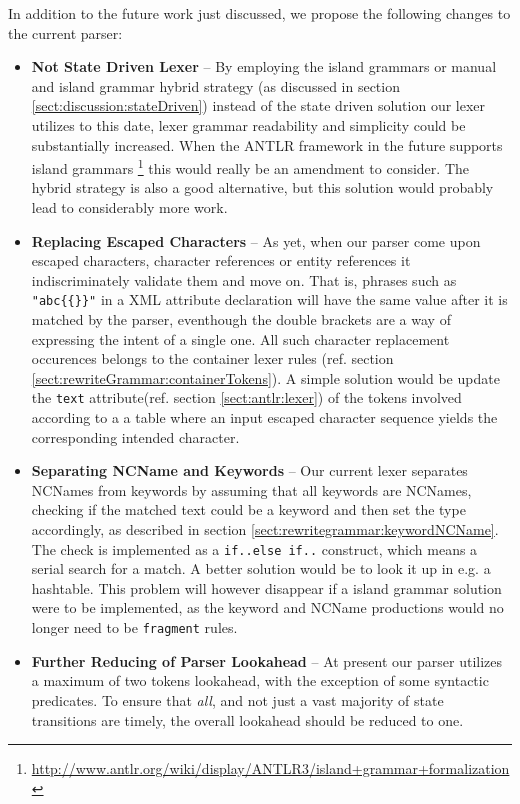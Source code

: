 In addition to the future work just discussed, we propose the following changes
to the current parser:
\begin{itemize}
\item \textbf{Not State Driven Lexer} -- By employing the island grammars or
manual and island grammar hybrid strategy (as discussed in section
\ref{sect:discussion:stateDriven}) instead of the state driven solution our
lexer utilizes to this date, lexer grammar readability and simplicity could be
substantially increased. When the ANTLR framework in the future supports island
grammars
\footnote{\url{http://www.antlr.org/wiki/display/ANTLR3/island+grammar+formalization}}
this would really be an amendment to consider. The hybrid strategy is also a
good alternative, but this solution would probably lead to considerably more
work.

\item \textbf{Replacing Escaped Characters} -- As yet, when our parser come
upon escaped characters, character references or entity references it
indiscriminately validate them and move on. That is, phrases such as
\verb!"abc{{}}"! in a XML attribute declaration will have the same value after
it is matched by the parser, eventhough the double brackets are a way of
expressing the intent of a single one. All such character replacement
occurences belongs to the container lexer rules (ref. section
\ref{sect:rewriteGrammar:containerTokens}). A simple solution would be update
the \verb!text! attribute(ref. section \ref{sect:antlr:lexer}) of the tokens
involved according to a a table where an input escaped character sequence
yields the corresponding intended character.

\item \textbf{Separating NCName and Keywords} -- Our current lexer separates
NCNames from keywords by assuming that all keywords are NCNames, checking if
the matched text could be a keyword and then set the type accordingly, as
described in section \ref{sect:rewritegrammar:keywordNCName}. The check is
implemented as a \verb!if..else if..! construct, which means a serial search
for a match. A better solution would be to look it up in e.g. a hashtable. This
problem will however disappear if a island grammar solution were to be
implemented, as the keyword and NCName productions would no longer need to be
\verb!fragment! rules.

\item \textbf{Further Reducing of Parser Lookahead} -- At present our parser utilizes a maximum of two tokens lookahead, with the exception of some syntactic predicates. To ensure that \emph{all}, and not just a vast majority of state transitions are timely, the overall lookahead should be reduced to one.


\end{itemize}

